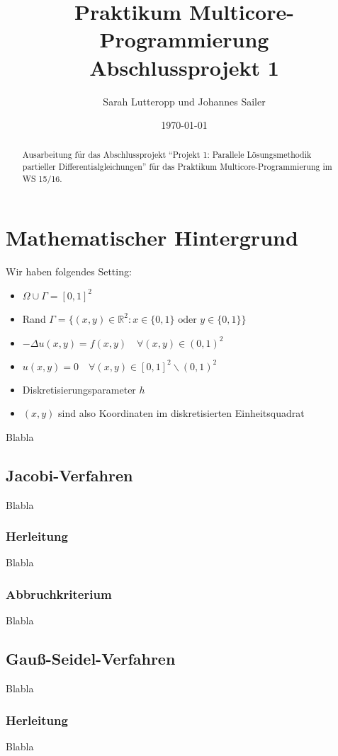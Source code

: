 \documentclass{article}
\title{Praktikum Multicore-Programmierung \\ Abschlussprojekt 1}
\author{Sarah Lutteropp und Johannes Sailer}
\date{\today}
\begin{document}
\maketitle


\begin{abstract}
Ausarbeitung für das Abschlussprojekt ``Projekt 1: Parallele Lösungsmethodik partieller Differentialgleichungen'' für das Praktikum Multicore-Programmierung im WS 15/16.
\end{abstract}

\section{Mathematischer Hintergrund}

Wir haben folgendes Setting:
\begin{itemize}
	\item $\Omega \cup \Gamma = [0,1]^2$
	\item Rand $\Gamma = \{(x,y) \in \mathbb{R}^2 : x \in \{0,1\} \text{ oder }  y \in \{0,1\} \}$
	\item $-\Delta u(x,y) = f(x,y) \quad \forall (x,y) \in (0,1)^2$
	\item $u(x,y) = 0 \quad \forall (x,y) \in [0,1]^2 \backslash (0,1)^2$
	
	\item Diskretisierungsparameter $h$
	\item $(x,y)$ sind also Koordinaten im diskretisierten Einheitsquadrat
\end{itemize}

Blabla
\subsection{Jacobi-Verfahren}
Blabla
\subsubsection{Herleitung}
Blabla
\subsubsection{Abbruchkriterium}
Blabla

\subsection{Gauß-Seidel-Verfahren}
Blabla
\subsubsection{Herleitung}
Blabla
\end{document}
